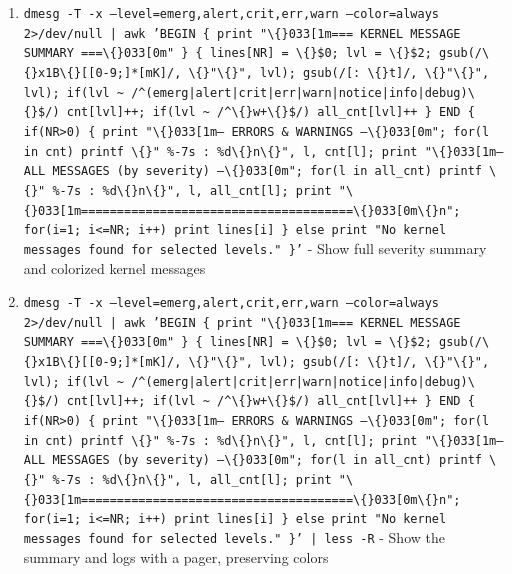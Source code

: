 \documentclass{article}
\begin{document}
\begin{enumerate}
  \item \texttt{dmesg -T -x --level=emerg,alert,crit,err,warn --color=always 2>/dev/null | awk 'BEGIN \{ print "\textbackslash\{\}033[1m=== KERNEL MESSAGE SUMMARY ===\textbackslash\{\}033[0m" \} \{ lines[NR] = \textbackslash\{\}\$0; lvl = \textbackslash\{\}\$2; gsub(/\textbackslash\{\}x1B\textbackslash\{\}[[0-9;]*[mK]/, \textbackslash\{\}"\textbackslash\{\}", lvl); gsub(/[: \textbackslash\{\}t]/, \textbackslash\{\}"\textbackslash\{\}", lvl); if(lvl \textasciitilde{} /\textasciicircum{}(emerg|alert|crit|err|warn|notice|info|debug)\textbackslash\{\}\$/) cnt[lvl]++; if(lvl \textasciitilde{} /\textasciicircum{}\textbackslash\{\}w+\textbackslash\{\}\$/) all\_cnt[lvl]++ \} END \{ if(NR>0) \{ print "\textbackslash\{\}033[1m--- ERRORS \& WARNINGS ---\textbackslash\{\}033[0m"; for(l in cnt) printf \textbackslash\{\}"  \%-7s : \%d\textbackslash\{\}n\textbackslash\{\}", l, cnt[l]; print "\textbackslash\{\}033[1m--- ALL MESSAGES (by severity) ---\textbackslash\{\}033[0m"; for(l in all\_cnt) printf \textbackslash\{\}"  \%-7s : \%d\textbackslash\{\}n\textbackslash\{\}", l, all\_cnt[l]; print "\textbackslash\{\}033[1m======================================\textbackslash\{\}033[0m\textbackslash\{\}n"; for(i=1; i<=NR; i++) print lines[i] \} else print "No kernel messages found for selected levels." \}'} - Show full severity summary and colorized kernel messages
  \item \texttt{dmesg -T -x --level=emerg,alert,crit,err,warn --color=always 2>/dev/null | awk 'BEGIN \{ print "\textbackslash\{\}033[1m=== KERNEL MESSAGE SUMMARY ===\textbackslash\{\}033[0m" \} \{ lines[NR] = \textbackslash\{\}\$0; lvl = \textbackslash\{\}\$2; gsub(/\textbackslash\{\}x1B\textbackslash\{\}[[0-9;]*[mK]/, \textbackslash\{\}"\textbackslash\{\}", lvl); gsub(/[: \textbackslash\{\}t]/, \textbackslash\{\}"\textbackslash\{\}", lvl); if(lvl \textasciitilde{} /\textasciicircum{}(emerg|alert|crit|err|warn|notice|info|debug)\textbackslash\{\}\$/) cnt[lvl]++; if(lvl \textasciitilde{} /\textasciicircum{}\textbackslash\{\}w+\textbackslash\{\}\$/) all\_cnt[lvl]++ \} END \{ if(NR>0) \{ print "\textbackslash\{\}033[1m--- ERRORS \& WARNINGS ---\textbackslash\{\}033[0m"; for(l in cnt) printf \textbackslash\{\}"  \%-7s : \%d\textbackslash\{\}n\textbackslash\{\}", l, cnt[l]; print "\textbackslash\{\}033[1m--- ALL MESSAGES (by severity) ---\textbackslash\{\}033[0m"; for(l in all\_cnt) printf \textbackslash\{\}"  \%-7s : \%d\textbackslash\{\}n\textbackslash\{\}", l, all\_cnt[l]; print "\textbackslash\{\}033[1m======================================\textbackslash\{\}033[0m\textbackslash\{\}n"; for(i=1; i<=NR; i++) print lines[i] \} else print "No kernel messages found for selected levels." \}' | less -R} - Show the summary and logs with a pager, preserving colors

\end{enumerate}
\end{document}
